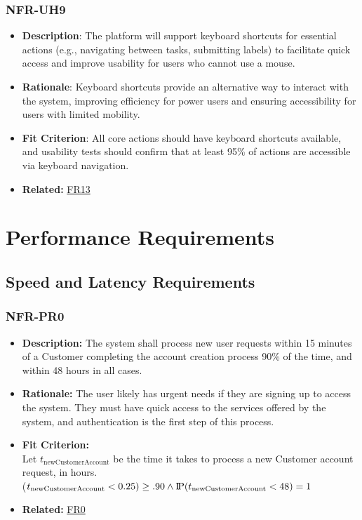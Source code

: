 \documentclass[12pt]{article}
\newcommand{\probP}{\text{I\kern-0.15em P}}
\begin{document}
        \subsubsection*{NFR-UH9} 
        \label{sec:UH9}
        \begin{itemize} 
            \item \textbf{Description}: The platform will support keyboard shortcuts for essential actions (e.g., navigating between tasks, submitting labels) to facilitate quick access and improve usability for users who cannot use a mouse.  
            \item \textbf{Rationale}: Keyboard shortcuts provide an alternative way to interact with the system, improving efficiency for power users and ensuring accessibility for users with limited mobility.  
            \item \textbf{Fit Criterion}: All core actions should have keyboard shortcuts available, and usability tests should confirm that at least 95\% of actions are accessible via keyboard navigation.
            \item \textbf{Related:} \hyperref[sec:FR13]{FR13}
        \end{itemize}



\section{Performance Requirements}
\subsection{Speed and Latency Requirements}
\subsubsection*{NFR-PR0}
\label{sec:PR0}
\begin{itemize}
  \item \textbf{Description:} The system shall process new user requests within 15 minutes of a Customer completing the account creation process 90\% of the time, and within 48 hours in all cases. 
  \item \textbf{Rationale:} The user likely has urgent needs if they are signing up to access the system. They must have quick access to the services offered by the system, and authentication is the first step of this process.
  \item \textbf{Fit Criterion:}\\ Let $t_{\text{newCustomerAccount}}$ be the time it takes to process a new Customer account request, in hours.\\ \probP($t_{\text{newCustomerAccount}} < 0.25) \geq .90 \wedge \probP(t_{\text{newCustomerAccount}} < 48) = 1 $
  \item \textbf{Related:} \hyperref[sec:FR0]{FR0}
\end{itemize}
\end{document}
